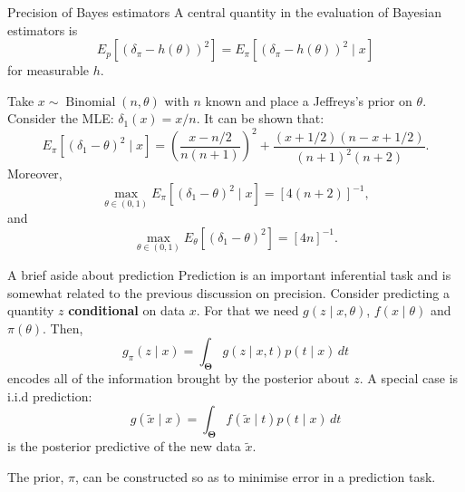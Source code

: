\begin{frame}{Precision of Bayes estimators}
 A central quantity in the evaluation of Bayesian estimators is
 \begin{equation}
  \label{eq:bayes_risk}
  E_p\left[\left(\delta_\pi - h(\theta)\right)^2\right] = E_{\pi}\left[\left(\delta_\pi - h(\theta)\right)^2 \mid x \right]
 \end{equation}
for measurable $h$.
\begin{example}
 Take $x \sim \operatorname{Binomial}(n, \theta)$ with $n$ known and place a Jeffreys's prior on $\theta$.
 Consider the MLE: $\delta_1(x) = x/n$.
 It can be shown that:
 $$ E_\pi\left[\left(\delta_1 - \theta \right)^2 \mid x \right] = \left(\frac{x - n/2}{n(n+1)}\right)^2 +  \frac{(x + 1/2)(n - x + 1/2)}{(n + 1)^2(n+2)}.$$
 Moreover,
 $$\max_{\theta \in (0, 1)}  E_\pi\left[\left(\delta_1 - \theta\right)^2 \mid x \right] = [4(n+2)]^{-1},$$
 and
 $$ \max_{\theta \in (0, 1)} E_\theta \left[\left(\delta_1 - \theta\right)^2\right] = [4n]^{-1}.$$ 
\end{example}
\end{frame}
\begin{frame}{A brief aside about prediction}
 Prediction is an important inferential task and is somewhat related to the previous discussion on precision.
 Consider predicting a quantity $z$ \textbf{conditional} on data $x$.
 For that  we need $g(z \mid x, \theta)$, $f(x\mid \theta)$ and $\pi(\theta)$.
 Then,
 \begin{equation}
  \label{eq:general_predictive}
  g_\pi(z\mid x) = \int_{\boldsymbol{\Theta}} g(z\mid x, t) p(t \mid x)\,dt
 \end{equation}
encodes all of the information brought by the posterior about $z$.
A special case  is i.i.d prediction:
\begin{equation}
 \label{eq:posterior_predictive_data}
 g(\tilde{x} \mid x) = \int_{\boldsymbol{\Theta}} f(\tilde{x} \mid t) p(t \mid x)\,dt
\end{equation}
is the posterior predictive of the new data $\tilde{x}$.
\begin{idea}
\label{idea:prediction_calibrated_priors}
The prior, $\pi$, can be constructed so as to minimise error in a prediction task. 
\end{idea}
\end{frame}
